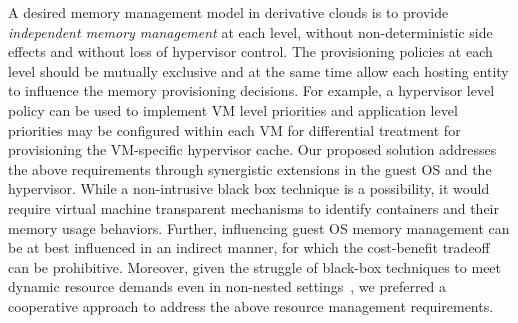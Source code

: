 %
%
A desired memory management model in derivative clouds is to
provide {\em independent memory management} at each level,
without non-deterministic side effects and without loss of
hypervisor control.
%
The provisioning policies at each level should be mutually
exclusive and at the same time allow each hosting entity
to influence the memory provisioning decisions.
%
For example, a hypervisor level policy can be used to 
implement VM level priorities and application level priorities 
may be configured within each VM for differential treatment
for provisioning the VM-specific hypervisor cache. 
%
%
%
Our proposed solution addresses the above requirements 
through synergistic extensions in the guest OS
and the hypervisor. 
%
%
While a non-intrusive black box technique is a possibility,
it would require virtual machine transparent mechanisms to
identify containers and their memory usage behaviors.
%
Further, influencing guest OS memory management can be at best
influenced in an indirect manner, for which the cost-benefit
tradeoff can be prohibitive.
%
%
Moreover, given the struggle of black-box techniques 
to meet dynamic resource demands even in non-nested settings~\cite{vmware,membal}, 
we preferred a cooperative approach to address the above 
resource management requirements. 
%

